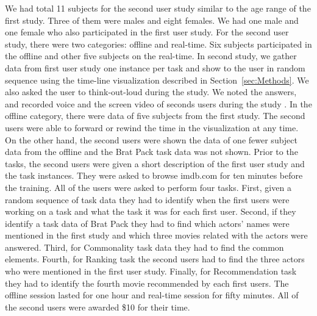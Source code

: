We had total 11 subjects for the second user study similar to the age range of the first study. Three of them were males and eight females. We had one male and one female who also participated in the first user study. For the second user study, there were two categories: offline and real-time. Six subjects participated in the offline and other five subjects on the real-time. In second study, we gather data from first user study one instance per task and show to the user in random sequence using the time-line visualization described in Section~\ref{sec:Methods}. We also asked the user to think-out-loud during the study. We noted the answers, and recorded voice and the screen video of seconds users during the study . In the offline category, there were data of five subjects from the first study. The second users were able to forward or rewind the time in the visualization at any time. On the other hand, the second users were shown the data of one fewer subject data from the offline and the Brat Pack task data was not shown. Prior to the tasks, the second users were given a short description of the first user study and the task instances. They were asked to browse imdb.com for ten minutes before the training. All of the users were asked to perform four tasks. First, given a random sequence of task data they had to identify when the first users were working on a task and what the task it was for each first user. Second, if they identify a task data of Brat Pack they had to find which actors' names were mentioned in the first study and which three movies related with the actors were answered. Third, for Commonality task data they had to find the common elements. Fourth, for Ranking task the second users had to find the three actors who were mentioned in the first user study. Finally, for Recommendation task they had to identify the fourth movie recommended by each first users. The offline session lasted for one hour and real-time session for fifty minutes. All of the second users were awarded \$10 for their time. 

